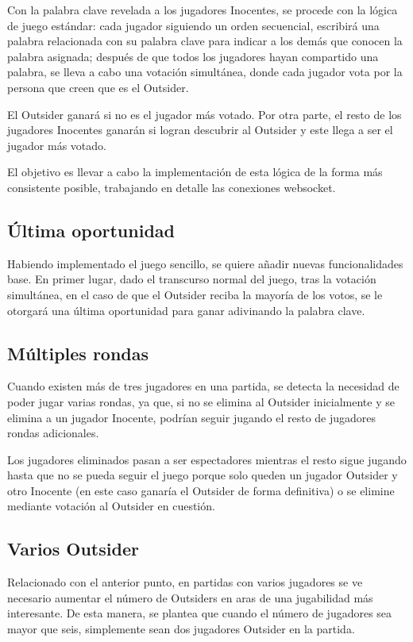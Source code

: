Con la palabra clave revelada a los jugadores Inocentes, se procede con la lógica de juego estándar: cada jugador siguiendo 
un orden secuencial, escribirá una palabra relacionada con su palabra clave
para indicar a los demás que conocen la palabra asignada; después de que todos los jugadores hayan compartido una
palabra, se lleva a cabo una votación simultánea, donde cada jugador vota por la persona que creen
que es el Outsider.

El Outsider ganará si no es el jugador más votado. Por otra parte, el resto de los jugadores Inocentes ganarán
si logran descubrir al Outsider y este llega a ser el jugador más votado.

El objetivo es llevar a cabo la implementación de esta lógica de la forma más consistente posible, trabajando en
detalle las conexiones websocket.

\subsection{Última oportunidad}

Habiendo implementado el juego sencillo, se quiere añadir nuevas funcionalidades base. En primer lugar, dado el transcurso
normal del juego, tras la votación simultánea, en el caso de que el Outsider reciba la mayoría de los votos, se le otorgará
una última oportunidad para ganar adivinando la palabra clave.

\subsection{Múltiples rondas}

Cuando existen más de tres jugadores en una partida, se detecta la necesidad de poder jugar varias rondas,
ya que, si no se elimina al Outsider inicialmente y se elimina a un jugador Inocente, podrían seguir jugando el resto de jugadores
rondas adicionales.

Los jugadores eliminados pasan a ser espectadores mientras el resto sigue jugando hasta que no 
se pueda seguir el juego porque solo queden un jugador Outsider y otro Inocente (en este caso
ganaría el Outsider de forma definitiva) o se elimine mediante votación al Outsider en cuestión.

\subsection{Varios Outsider}

Relacionado con el anterior punto, en partidas con varios jugadores se ve necesario aumentar el número de Outsiders en aras de
una jugabilidad más interesante. De esta manera, se plantea que cuando el número de jugadores sea mayor que seis, simplemente sean
dos jugadores Outsider en la partida.

